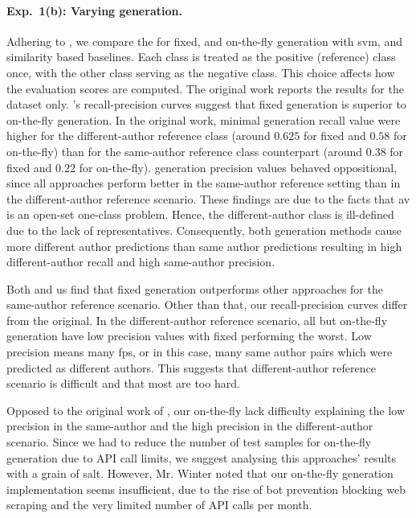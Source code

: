 \paragraph{Exp.\ 1(b): Varying \imp{} generation.}

Adhering to \citet{koppel_determining_2014}, we compare the \impAppr{} for fixed, and on-the-fly \imp{} generation with \ac{svm}, and similarity based baselines.
Each class is treated as the positive (reference) class once, with the other class serving as the negative class. 
This choice affects how the evaluation scores are computed.
The original work reports the results for the \dataBlog{} dataset only.
\citet{koppel_determining_2014}'s recall-precision curves suggest that fixed \imp{} generation is superior to on-the-fly \imp{} generation.
In the original work, minimal \imp{} generation recall value were higher for the different-author reference class (around $0.625$ for fixed and $0.58$ for on-the-fly) than for the same-author reference class counterpart (around $0.38$ for fixed and $0.22$ for on-the-fly).
\Imp{} generation precision values behaved oppositional, since all approaches perform better in the same-author reference setting than in the different-author reference scenario.
These findings are due to the facts that \ac{av} is an open-set one-class problem.
Hence, the different-author class is ill-defined due to the lack of representatives.
Consequently, both \imp{} generation methods cause more different author predictions than same author predictions resulting in high different-author recall and high same-author precision.

Both \citet{koppel_determining_2014} and us find that fixed \imp{} generation outperforms other approaches for the same-author reference scenario.
Other than that, our recall-precision curves differ from the original.
In the different-author reference scenario, all but on-the-fly generation have low precision values with fixed \imps{} performing the worst. 
Low precision means many \acp{fp}, or in this case, many same author pairs which were predicted as different authors.
This suggests that different-author reference scenario is difficult and that most \imps{} are too hard. 

Opposed to the original work of \citet{koppel_determining_2014}, our on-the-fly \imps{} lack difficulty explaining the low precision in the same-author and the high precision in the different-author scenario.
Since we had to reduce the number of test samples for on-the-fly \imp{} generation due to API call limits, we suggest analysing this approaches' results with a grain of salt.
However, Mr. Winter noted that our on-the-fly \imp{} generation implementation seems insufficient, due to the rise of bot prevention blocking web scraping and the very limited number of API calls per month.

